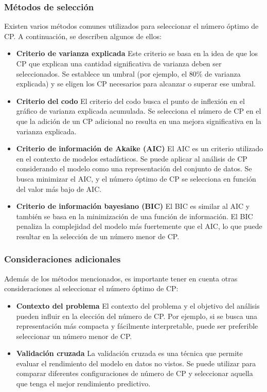 \documentclass{article}
\begin{document}
\subsubsection{Métodos de selección}
Existen varios métodos comunes utilizados para seleccionar el número óptimo de CP. A continuación, se describen algunos de ellos:

\begin{itemize}

\item \textbf{Criterio de varianza explicada}
Este criterio se basa en la idea de que los CP que explican una cantidad significativa de varianza deben ser seleccionados. Se establece un umbral (por ejemplo, el 80\% de varianza explicada) y se eligen los CP necesarios para alcanzar o superar ese umbral.

\item \textbf{Criterio del codo}
El criterio del codo busca el punto de inflexión en el gráfico de varianza explicada acumulada. Se selecciona el número de CP en el que la adición de un CP adicional no resulta en una mejora significativa en la varianza explicada.

\item \textbf{Criterio de información de Akaike (AIC)}
El AIC es un criterio utilizado en el contexto de modelos estadísticos. Se puede aplicar al análisis de CP considerando el modelo como una representación del conjunto de datos. Se busca minimizar el AIC, y el número óptimo de CP se selecciona en función del valor más bajo de AIC.

\item \textbf{Criterio de información bayesiano (BIC)}
El BIC es similar al AIC y también se basa en la minimización de una función de información. El BIC penaliza la complejidad del modelo más fuertemente que el AIC, lo que puede resultar en la selección de un número menor de CP.
\end{itemize}
\subsubsection{Consideraciones adicionales}
Además de los métodos mencionados, es importante tener en cuenta otras consideraciones al seleccionar el número óptimo de CP:

\begin{itemize}
\item \textbf{Contexto del problema}
El contexto del problema y el objetivo del análisis pueden influir en la elección del número de CP. Por ejemplo, si se busca una representación más compacta y fácilmente interpretable, puede ser preferible seleccionar un número menor de CP.

\item \textbf{Validación cruzada}
La validación cruzada es una técnica que permite evaluar el rendimiento del modelo en datos no vistos. Se puede utilizar para comparar diferentes configuraciones de número de CP y seleccionar aquella que tenga el mejor rendimiento predictivo.

\end{itemize}
\end{document}
